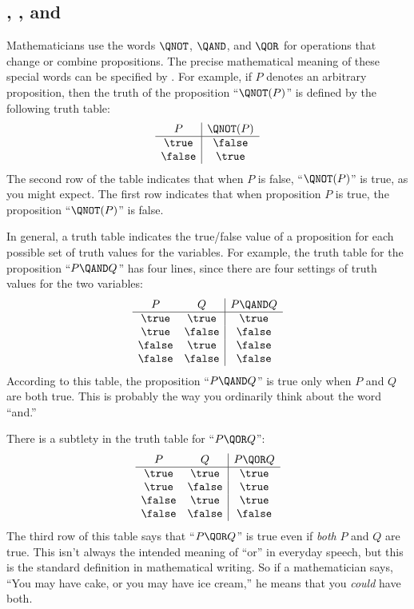 \subsection{\QNOT, \QAND, and \QOR}

 Mathematicians use the words $\QNOT$, $\QAND$, and $\QOR$
for operations that change or combine propositions.  The precise
mathematical meaning of these special words can be specified by
.  For example, if $P$ denotes an arbitrary
proposition, then the truth of the proposition ``$\QNOT(P)$'' is defined
by the following truth table:
%
\[
\begin{array}{c|c}
P & \QNOT(P) \\ \hline
\true & \false \\
\false & \true \\
\end{array}
\]
%
The second row of the table indicates that when $P$ is false,
``$\QNOT(P)$'' is true, as you might expect.  The first row indicates that
when proposition $P$ is true, the proposition ``$\QNOT(P)$'' is false.

In general, a truth table indicates the true/false value of a proposition
 for each possible set of truth
values for the variables.  For example, the truth table for the
proposition ``$P \QAND Q$'' has four lines, since there are four settings
of truth values for the two variables:
%
\[
\begin{array}{cc|c}
P & Q & P \QAND Q \\ \hline
\true & \true & \true \\
\true & \false & \false \\
\false & \true & \false \\
\false & \false & \false
\end{array}
\]
%
According to this table, the proposition ``$P \QAND Q$'' is true only when
$P$ and $Q$ are both true.  This is probably the way you ordinarily think
about the word ``and.''

There is a subtlety in the truth table for ``$P \QOR Q$'':
%
\[
\begin{array}{cc|c}
P & Q & P \QOR Q \\ \hline
\true & \true & \true \\
\true & \false & \true \\
\false & \true & \true \\
\false & \false & \false
\end{array}
\]
%
The third row of this table says that ``$P \QOR Q$'' is true even if
\emph{both} $P$ and $Q$ are true.  This isn't always the intended
meaning of ``or'' in everyday speech, but this is the standard definition
in mathematical writing.  So if a mathematician says, ``You may have cake,
or you may have ice cream,'' he means that you \emph{could} have both.

